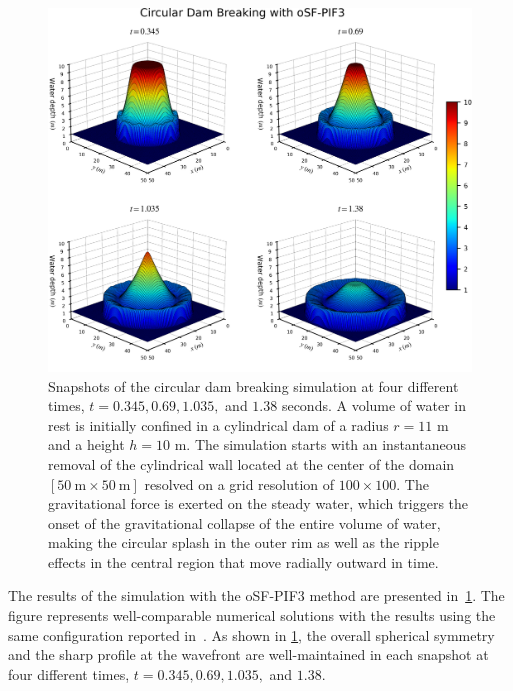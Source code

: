 \begin{figure}
    \centering
    \includegraphics[width=\textwidth]{fig/swe_circ_osf3_all.png}
    \caption{Snapshots of the circular dam breaking simulation
        at four different times, \( t = 0.345, 0.69, 1.035, \) and $1.38$ seconds.
        A volume of water in rest is initially confined
        in a cylindrical dam of a radius $r=11$ m and a height $h=10$ m.
        The simulation starts with an instantaneous removal of the cylindrical wall
        located at the center of the domain
        \( \left[ \SI{50}{\meter} \times \SI{50}{\meter} \right] \)
        resolved on a grid resolution of $100 \times 100$.
        The gravitational force is exerted on the steady water,
        which triggers the onset of the gravitational collapse of the entire volume of water,
        making the circular splash in the outer rim as well as the ripple effects
        in the central region that move radially outward in time.
    }\label{fig:swe_circ}
\end{figure}

The results of the simulation with the oSF-PIF3 method are presented in~\cref{fig:swe_circ}.
The figure represents well-comparable numerical solutions
with the results using the same configuration
reported in~\cite{alcrudo1993high,toro2001shock,delis2005numerical}.
As shown in \cref{fig:swe_circ}, the overall spherical symmetry and the sharp profile
at the wavefront are well-maintained in each snapshot
at four different times, \( t = 0.345, 0.69, 1.035, \) and \( 1.38 \).



